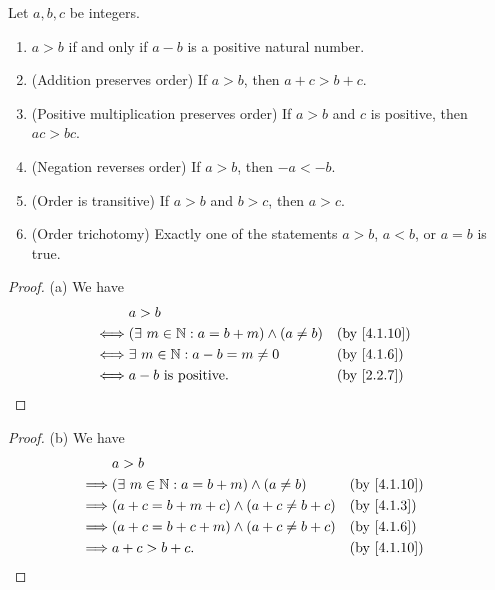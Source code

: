 \begin{lem}\label{4.1.11}
  Let \(a, b, c\) be integers.
  \begin{enumerate}
    \item \(a > b\) if and only if \(a - b\) is a positive natural number.
    \item (Addition preserves order) If \(a > b\), then \(a + c > b + c\).
    \item (Positive multiplication preserves order) If \(a > b\) and \(c\) is positive, then \(ac > bc\).
    \item (Negation reverses order) If \(a > b\), then \(-a < -b\).
    \item (Order is transitive) If \(a > b\) and \(b > c\), then \(a > c\).
    \item (Order trichotomy) Exactly one of the statements \(a > b\), \(a < b\), or \(a = b\) is true.
  \end{enumerate}
\end{lem}

\begin{proof}{(a)}
  We have
  \begin{align*}
         & a > b                                                                           \\
    \iff & (\exists\ m \in \N : a = b + m) \land (a \neq b) &  & \text{(by \cref{4.1.10})} \\
    \iff & \exists\ m \in \N : a - b = m \neq 0             &  & \text{(by \cref{4.1.6})}  \\
    \iff & a - b \text{ is positive}.                       &  & \text{(by \cref{2.2.7})}
  \end{align*}
\end{proof}

\begin{proof}{(b)}
  We have
  \begin{align*}
             & a > b                                                                           \\
    \implies & (\exists\ m \in \N : a = b + m) \land (a \neq b) &  & \text{(by \cref{4.1.10})} \\
    \implies & (a + c = b + m + c) \land (a + c \neq b + c)     &  & \text{(by \cref{4.1.3})}  \\
    \implies & (a + c = b + c + m) \land (a + c \neq b + c)     &  & \text{(by \cref{4.1.6})}  \\
    \implies & a + c > b + c.                                   &  & \text{(by \cref{4.1.10})}
  \end{align*}
\end{proof}

